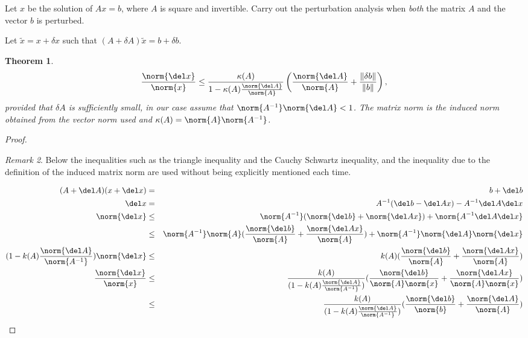 \documentclass[10pt]{amsart}
\newtheorem{thm}{Theorem}[subsection]
\theoremstyle{remark}
\newtheorem{rem}[thm]{Remark}
\begin{document}
\section{}
Let $x$ be the solution of $Ax = b$, where $A$ is square and
invertible.  Carry out the perturbation analysis when \emph{both} the
matrix $A$ and the vector $b$ is perturbed.

Let $\tilde{x} = x + \delta x$ such that $(A+\delta A)\tilde{x} = b+\delta b$.  

\begin{thm}
$$\frac{\norm{\del x}}{\norm{x}} \leq
\frac{\kappa(A)}{1-\kappa(A)\frac{\norm{\del A}}{\norm{A}}}
\left(\frac{\norm{\del A}}{\norm{A}} + \frac{\|\delta b\|}{\|b\|}\right),$$
provided that $\delta A$ is sufficiently small, in our case assume that
$\norm{A^{-1}}\norm{\del A} < 1$.  The matrix norm is the induced norm
obtained from the vector norm used and $\kappa(A) =
\norm{A}\norm{A^{-1}}$.
\end{thm}
\begin{proof}
\begin{rem}
Below the inequalities such as the triangle inequality and the Cauchy Schwartz inequality, and the inequality due to the definition of the induced matrix norm are used without being explicitly mentioned each time.
\end{rem}
\begin{eqnarray*}
(A+\del A) (x+ \del x) & = & b + \del b\\
\del x & = & A^{-1}(\del b - \del A x) - A^{-1}\del A \del x\\
\norm{\del x} &\leq& \norm{A^{-1}}(\norm{\del b} + \norm{\del A x}) + \norm{A^{-1}\del A \del x}\\
&\leq& \norm{A^{-1}}\norm{A}(\frac{\norm{\del b}}{\norm{A}} + \frac{\norm{\del A x}}{\norm{A}}) + \norm{A^{-1}}\norm{\del A}\norm{\del x}\\
(1-k(A)\frac{\norm{\del A}}{\norm{A^{-1}}})\norm{\del x}&\leq& k(A)(\frac{\norm{\del b}}{\norm{A}} + \frac{\norm{\del A x}}{\norm{A}})\\
\frac{\norm{\del x}}{\norm{x}} &\leq& \frac{k(A)}{(1-k(A)\frac{\norm{\del A}}{\norm{A^{-1}}})}(\frac{\norm{\del b}}{\norm{A}\norm{x}} + \frac{\norm{\del A x}}{\norm{A}\norm{x}})\\
&\leq & \frac{k(A)}{(1-k(A)\frac{\norm{\del A}}{\norm{A^{-1}}})}(\frac{\norm{\del b}}{\norm{b}} + \frac{\norm{\del A}}{\norm{A}})\\
\end{eqnarray*}

\end{proof}
\end{document}
